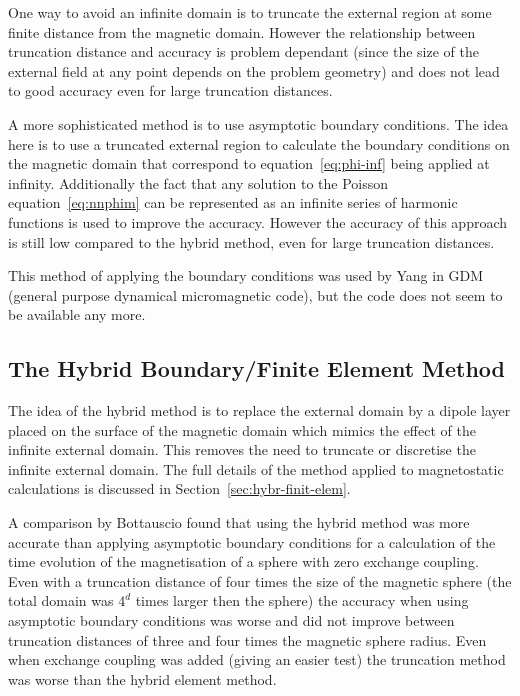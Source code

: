 One way to avoid an infinite domain is to truncate the external region at some finite distance from the magnetic domain. However the relationship between truncation distance and accuracy is problem dependant (since the size of the external field at any point depends on the problem geometry) and does not lead to good accuracy even for large truncation distances.

A more sophisticated method is to use asymptotic boundary conditions.\cite{Yang1997} The idea here is to use a truncated external region to calculate the boundary conditions on the magnetic domain that correspond to equation~\eqref{eq:phi-inf} being applied at infinity. Additionally the fact that any solution to the Poisson equation~\eqref{eq:nnphim} can be represented as an infinite series of harmonic functions is used to improve the accuracy. However the accuracy of this approach is still low compared to the hybrid method, even for large truncation distances.\cite{Bottauscio2008}

This method of applying the boundary conditions was used by Yang in GDM\cite{Yang1997} (general purpose dynamical micromagnetic code), but the code does not seem to be available any more.

\subsection{The Hybrid Boundary/Finite Element Method}
\label{sec:bound-elem-meth}

The idea of the hybrid method is to replace the external domain by a dipole layer placed on the surface of the magnetic domain which mimics the effect of the infinite external domain. This removes the need to truncate or discretise the infinite external domain. The full details of the method applied to magnetostatic calculations is discussed in Section~\ref{sec:hybr-finit-elem}.

A comparison by Bottauscio\cite{Bottauscio2008} found that using the hybrid method was more accurate than applying asymptotic boundary conditions for a calculation of the time evolution of the magnetisation of a sphere with zero exchange coupling. Even with a truncation distance of four times the size of the magnetic sphere (the total domain was $4^d$ times larger then the sphere) the accuracy when using asymptotic boundary conditions was worse and did not improve between truncation distances of three and four times the magnetic sphere radius. Even when exchange coupling was added (giving an easier test) the truncation method was worse than the hybrid element method.

